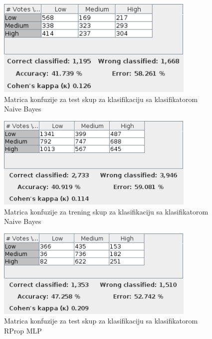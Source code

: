 \documentclass[11pt]{article} %
\begin{document}
\newline
\begin{figure}[h!]
	\centering
	\includegraphics[width=0.85\textwidth]{votesClassificationTest/NaiveBayes}
	\caption{Matrica konfuzije za test skup za klasifikaciju sa klasifikatorom Naive Bayes}
\end{figure}
\begin{figure}[h!]
	\centering
	\includegraphics[width=0.85\textwidth]{votesClassificationTraining/NaiveBayes}
	\caption{Matrica konfuzije za trening skup za klasifikaciju sa klasifikatorom Naive Bayes}
\end{figure}
\newline
\begin{figure}[h!]
	\centering
	\includegraphics[width=0.85\textwidth]{votesClassificationTest/RProp}
	\caption{Matrica konfuzije za test skup za klasifikaciju sa klasifikatorom RProp MLP}
\end{figure}
\end{document}
